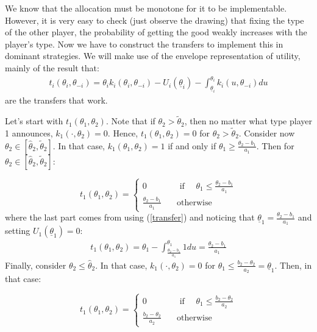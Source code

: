 \documentclass[a4paper]{article}
\begin{document}
	We know that the allocation must be monotone for it to be implementable. However, it is very easy to check (just observe the drawing) that fixing the type of the other player, the probability of getting the good weakly increases with the player's type. Now we have to construct the transfers to implement this in dominant strategies. We will make use of the envelope representation of utility, mainly of the result that:
	\begin{align} \label{transfer}
		t_i(\theta_i,\theta_{-i}) = \theta_i k_i(\theta_i,\theta_{-i}) - U_i(\underline{\theta}_{i}) - \int_{\underline{\theta}_{i}}^{\theta_i} k_{i} (u,\theta_{-i}) du
	\end{align}
	are the transfers that work.
	
	Let's start with $t_1(\theta_1,\theta_2)$. Note that if $\theta_2>\tilde{\theta}_2$, then no matter what type player 1 announces, $k_1(\cdot,\theta_2)=0$. Hence, $t_1(\theta_1,\theta_2)=0$ for $\theta_2>\tilde{\theta}_2$. Consider now $\theta_2\in[\hat{\theta}_2,\tilde{\theta}_2]$. In that case, $k_1(\theta_1,\theta_2)=1$ if and only if $\theta_1\geq\frac{\theta_2-b_1}{a_1}$. Then for $\theta_2\in[\hat{\theta}_2,\tilde{\theta}_2]$:
	
	\[t_1(\theta_1,\theta_2)=\left\{\begin{array}{cc} 0 & \quad\text{ if }\quad  \theta_1\leq\frac{\theta_2-b_1}{a_1}\\
		\frac{\theta_2-b_1}{a_1} & \quad\text{otherwise}\quad
		
	\end{array}
	\right.
	\]
	where the last part comes from using (\ref{transfer}) and noticing that $\underline{\theta}_1=\frac{\theta_2-b_1}{a_1}$ and setting $U_1(\underline{\theta}_1)=0$:
	\begin{align*}
		t_1(\theta_1,\theta_2)=\theta_1-\int_{\frac{\theta_2-b_1}{a_1}}^{\theta_1}1 du=\frac{\theta_2-b_1}{a_1}
	\end{align*}
	Finally, consider $\theta_2\leq\hat{\theta}_2$. In that case, $k_1(\cdot,\theta_2)=0$ for $\theta_1\leq \frac{b_2-\theta_2}{a_2}=\underline{\theta}_1$. Then, in that case:
	
	\[t_1(\theta_1,\theta_2)=\left\{\begin{array}{cc} 0 & \quad\text{ if }\quad  \theta_1\leq\frac{b_2-\theta_2}{a_2}\\
		\frac{b_2-\theta_2}{a_2} & \quad\text{otherwise}\quad
		
	\end{array}
	\right.
	\]
	
\end{document}
